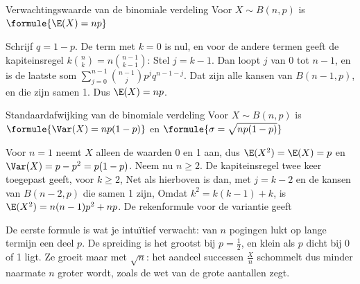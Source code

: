 \begin{theorie}
\begin{stelling}{Verwachtingswaarde van de binomiale verdeling}
Voor $X \sim B(n, p)$ is \quad $\formule{\E(X) = np}$
\end{stelling}

\begin{bewijs}
Schrijf $q = 1 - p$. De term met $k = 0$ is nul, en voor de andere termen geeft de kapiteinsregel $k\binom{n}{k} = n\binom{n-1}{k-1}$:
Stel $j = k - 1$. Dan loopt $j$ van 0 tot $n - 1$, en is de laatste som $\sum_{j=0}^{n-1} \binom{n-1}{j} p^j q^{n-1-j}$. Dat zijn alle kansen van $B(n - 1, p)$, en die zijn samen 1. Dus $\E(X) = np$.
\end{bewijs}

\begin{stelling}{Standaardafwijking van de binomiale verdeling}
Voor $X \sim B(n, p)$ is \quad $\formule{\Var(X) = np(1 - p)}$ \quad en \quad $\formule{\sigma = \sqrt{np(1 - p)}}$
\end{stelling}

\begin{bewijs}
Voor $n = 1$ neemt $X$ alleen de waarden 0 en 1 aan, dus $\E(X^2) = \E(X) = p$ en $\Var(X) = p - p^2 = p(1 - p)$. Neem nu $n \geqslant 2$. De kapiteinsregel twee keer toegepast geeft, voor $k \geqslant 2$,
Net als hierboven is dan, met $j = k - 2$ en de kansen van $B(n - 2, p)$ die samen 1 zijn,
Omdat $k^2 = k(k - 1) + k$, is $\E(X^2) = n(n - 1)p^2 + np$. De rekenformule voor de variantie geeft
\end{bewijs}
\end{theorie}

De eerste formule is wat je intuïtief verwacht: van $n$ pogingen lukt op lange termijn een deel $p$. De spreiding is het grootst bij $p = \frac12$, en klein als $p$ dicht bij 0 of 1 ligt. Ze groeit maar met $\sqrt{n}$: het aandeel successen $\frac{X}{n}$ schommelt dus minder naarmate $n$ groter wordt, zoals de wet van de grote aantallen zegt.

